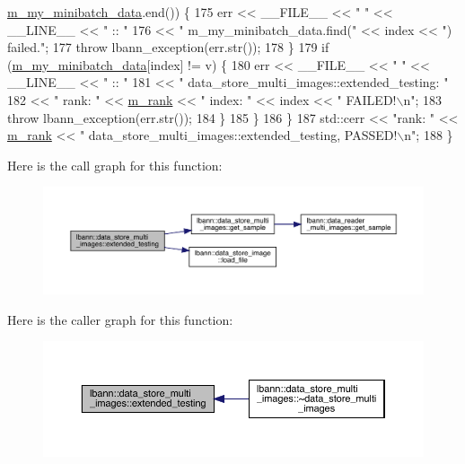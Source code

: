 \begin{DoxyCode}
      \hyperlink{classlbann_1_1data__store__image_a627a08479de191dcef74e633c4cded8c}{m\_my\_minibatch\_data}.end()) \{
175         err << \_\_FILE\_\_ << \textcolor{stringliteral}{" "} << \_\_LINE\_\_ << \textcolor{stringliteral}{" :: "} 
176             << \textcolor{stringliteral}{" m\_my\_minibatch\_data.find("} << index << \textcolor{stringliteral}{") failed."};
177         \textcolor{keywordflow}{throw} lbann\_exception(err.str());
178       \}
179       \textcolor{keywordflow}{if} (\hyperlink{classlbann_1_1data__store__image_a627a08479de191dcef74e633c4cded8c}{m\_my\_minibatch\_data}[index] != v) \{
180         err << \_\_FILE\_\_ << \textcolor{stringliteral}{" "} << \_\_LINE\_\_ << \textcolor{stringliteral}{" :: "} 
181             << \textcolor{stringliteral}{" data\_store\_multi\_images::extended\_testing: "}
182             << \textcolor{stringliteral}{" rank: "} << \hyperlink{classlbann_1_1generic__data__store_a87695bfd2d1ed0dbe01d99108e3f68b7}{m\_rank} << \textcolor{stringliteral}{" index: "} << index << \textcolor{stringliteral}{" FAILED!\(\backslash\)n"};
183         \textcolor{keywordflow}{throw} lbann\_exception(err.str());
184       \}
185     \}
186   \}
187   std::cerr << \textcolor{stringliteral}{"rank: "} << \hyperlink{classlbann_1_1generic__data__store_a87695bfd2d1ed0dbe01d99108e3f68b7}{m\_rank} << \textcolor{stringliteral}{" data\_store\_multi\_images::extended\_testing, PASSED!\(\backslash\)n"};
188 \}
\end{DoxyCode}
Here is the call graph for this function\+:\nopagebreak
\begin{figure}[H]
\begin{center}
\leavevmode
\includegraphics[width=350pt]{classlbann_1_1data__store__multi__images_abe17bbf485f6da9d7dfa568e9e74a693_cgraph}
\end{center}
\end{figure}
Here is the caller graph for this function\+:\nopagebreak
\begin{figure}[H]
\begin{center}
\leavevmode
\includegraphics[width=350pt]{classlbann_1_1data__store__multi__images_abe17bbf485f6da9d7dfa568e9e74a693_icgraph}
\end{center}
\end{figure}
